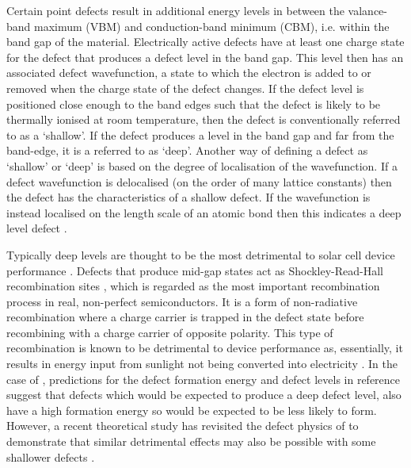 \documentclass[11pt, twoside]{report}
\begin{document}
Certain point defects result in additional energy levels in between the valance-band maximum (VBM) and conduction-band minimum (CBM), i.e. within the band gap of the material. Electrically active defects have at least one charge state for the defect that produces a defect level in the band gap. This level then has an associated defect wavefunction, a state to which the electron is added to or removed when the charge state of the defect changes. If the defect level is positioned close enough to the band edges such that the defect is likely to be thermally ionised at room temperature, then the defect is conventionally referred to as a `shallow'. If the defect produces a level in the band gap and far from the band-edge, it is a referred to as `deep'.  Another way of defining a defect as `shallow' or `deep' is based on the degree of localisation of the wavefunction. If a defect wavefunction is delocalised (on the order of many lattice constants) then the defect has the characteristics of a shallow defect. If the wavefunction is instead localised on the length scale of an atomic bond then this indicates a deep level defect \cite{defects_tutorial}. 

Typically deep levels are thought to be the most detrimental to solar cell device performance \cite{Stoneham_killer_defects}. 
Defects that produce mid-gap states act as Shockley-Read-Hall recombination sites \cite{SRH}, which is regarded as the most important recombination process in real, non-perfect semiconductors. It is a form of non-radiative recombination where a charge carrier is trapped in the defect state before recombining with a charge carrier of opposite polarity. This type of recombination is known to be detrimental to device performance as, essentially, it results in energy input from sunlight not being converted into electricity \cite{Nelson4}.
In the case of {\CZTS}, predictions for the defect formation energy and defect levels in reference  suggest that defects which would be expected to produce a deep defect level, also have a high formation energy so would be expected to be less likely to form.
However, a recent theoretical study has revisited the defect physics of {\CZTS} to demonstrate that similar detrimental effects may also be possible with some shallower defects \cite{Sunghyun_killer_defects}.
\end{document}
